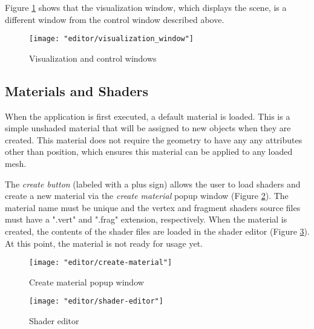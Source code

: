 Figure \ref{fig:visualization_window} shows that the visualization window, which displays the scene, is a different window from the control window described above.

\begin{figure}[ht]
    \caption{Visualization and control windows}
    \begin{center}
        \texttt{[image: "editor/visualization\_window"]}
    \end{center}
    \label{fig:visualization_window}
\end{figure}

\subsection{Materials and Shaders}
When the application is first executed, a default material is loaded. This is a simple unshaded material that will be assigned to new objects when they are created. This material does not require the geometry to have any any attributes other than position, which ensures this material can be applied to any loaded mesh.

The \textit{create button} (labeled with a plus sign) allows the user to load shaders and create a new material via the \textit{create material} popup window (Figure \ref{fig:create-material}). The material name must be unique and the vertex and fragment shaders source files must have a ".vert" and ".frag" extension, respectively. When the material is created, the contents of the shader files are loaded in the shader editor (Figure \ref{fig:shader-editor}). At this point, the material is not ready for usage yet.

\begin{figure}[h]
    \caption{Create material popup window}
    \begin{center}
        \texttt{[image: "editor/create-material"]}
    \end{center}
    \label{fig:create-material}
\end{figure}

\begin{figure}
    \caption{Shader editor}
    \begin{center}
        \texttt{[image: "editor/shader-editor"]}
    \end{center}
    \label{fig:shader-editor}
\end{figure}

